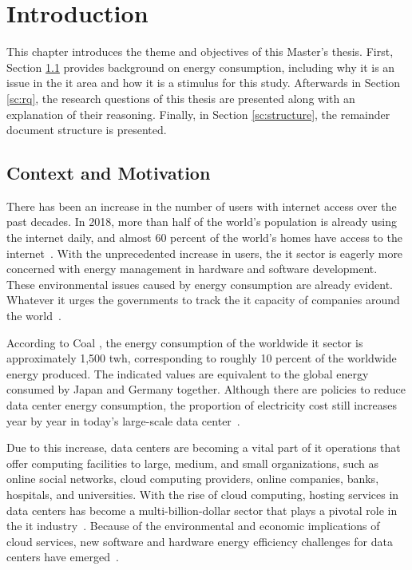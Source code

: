 \newcommand{\novathesis}{\emph{novathesis}}
\newcommand{\novathesisclass}{\texttt{novathesis.cls}}


\chapter{Introduction}
\label{cha:introduction}

This chapter introduces the theme and objectives of this Master's thesis. First, Section \ref{sc:context} provides background on energy consumption, including why it is an issue in the \gls{it} area and how it is a stimulus for this study.
Afterwards in Section \ref{sc:rq}, the research questions of this thesis are presented along with an explanation of their reasoning. Finally, in Section \ref{sc:structure}, the remainder document structure is presented.

\section{Context and Motivation}
\label{sc:context}
There has been an increase in the number of users with internet access over the past decades. In 2018, more than half of the world's population is already using the internet daily, and almost 60 percent of the world's homes have access to the internet~\cite{2018stat}.
With the unprecedented increase in users, the \gls{it} sector is eagerly more concerned with energy management in hardware and software development. 
These environmental issues caused by energy consumption are already evident. Whatever it urges the governments to track the \gls{it} capacity of companies around the world~\cite{gesi2008enabling,whitehead2014assessing,bilal2014trends,greenframework,dayarathna2015data}.

According to Coal \citeauthor{CCOAL18}, the energy consumption of the worldwide \gls{it} sector is approximately 1,500 \acrshort{twh}, corresponding to roughly 10 percent of the worldwide energy produced. The indicated values are equivalent to the global energy consumed by Japan and Germany together. Although there are policies to reduce data center energy consumption, the proportion of electricity cost still increases year by year in today's large-scale data center~\cite{trends}.

Due to this increase, data centers are becoming a vital part of \gls{it} operations that offer computing facilities to large, medium, and small organizations, such as online social networks, cloud computing providers, online companies, banks, hospitals, and universities. With the rise of cloud computing, hosting services in data centers has become a multi-billion-dollar sector that plays a pivotal role in the \gls{it} industry~\cite{dayarathna2015data,RONG2016674}.  Because of the environmental and economic implications of cloud services, new software and hardware energy efficiency challenges for data centers have emerged~\cite{dayarathna2015data}. 

